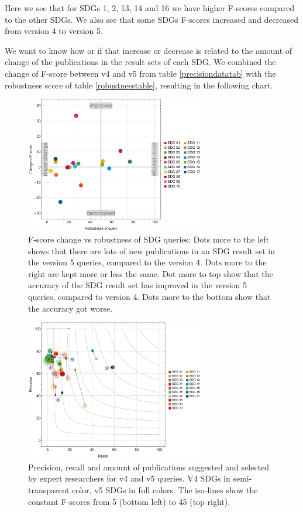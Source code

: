 \documentclass{article}
\begin{document}
Here we see that for SDGs 1, 2, 13, 14 and 16 we have higher F-scores compared to the other SDGs. We also see that some SDGs F-scores increased and decreased from version 4 to version 5.

We want to know how or if that increase or decrease is related to the amount of change of the publications in the result sets of each SDG. We combined the change of F-score between v4 and v5 from table \ref{precisiondatatab} with the robustness score of table \ref{robustnesstable}, resulting in the following chart. 

\begin{figure}[H]
	\centering
  \includegraphics[width=0.7\textwidth]{figures/scatterplot1-fscore-robustness.pdf}
	\caption{F-score change vs robustness of SDG queries: Dots more to the left shows that there are lots of new publications in an SDG result set in the version 5 queries, compared to the version 4. Dots more to the right are kept more or less the same. Dot more to top show that the accuracy of the SDG result set has improved in the version 5 queries, compared to version 4. Dots more to the bottom show that the accuracy got worse.}
	\label{fscore-vs-robustnes}
\end{figure}
\begin{figure}[H]
	\centering
  \includegraphics[width=0.7\textwidth]{figures/bubblechart2.pdf}
	\caption{Precision, recall and amount of publications suggested and selected by expert researchers for v4 and v5 queries. V4 SDGs in semi-transparent color, v5 SDGs in full colors. The iso-lines show the constant F-scores from 5 (bottom left) to 45 (top right). }
	\label{bubblechart}
\end{figure}
\end{document}
